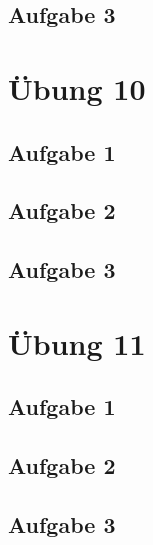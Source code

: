 \documentclass[a4paper]{article}
\begin{document}
\subsection{Aufgabe 3}
\textit{}




\newpage
\section{Übung 10}
\subsection{Aufgabe 1}
\textit{}

\subsection{Aufgabe 2}
\textit{}


\subsection{Aufgabe 3}
\textit{}




\newpage
\section{Übung 11}
\subsection{Aufgabe 1}
\textit{}

\subsection{Aufgabe 2}
\textit{}


\subsection{Aufgabe 3}
\textit{}
\end{document}
